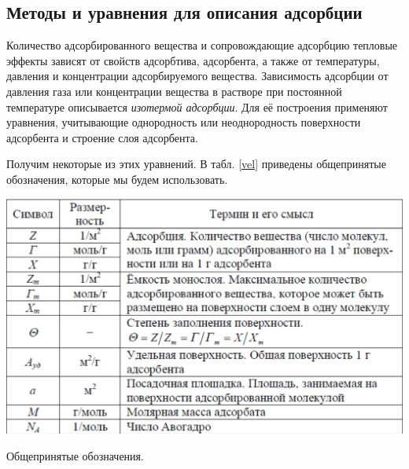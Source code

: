 \documentclass[a4paper,12pt]{article} %
\begin{document}
\subsection*{Методы и уравнения для описания адсорбции}
Количество адсорбированного вещества и сопровождающие адсорбцию тепловые эффекты зависят от свойств адсорбтива, адсорбента, а также от температуры, давления и концентрации адсорбируемого вещества. Зависимость адсорбции от давления газа или концентрации вещества в растворе при постоянной температуре описывается \textit{изотермой адсорбции}. Для её построения применяют уравнения, учитывающие однородность или неоднородность поверхности адсорбента и строение слоя адсорбента.
\par
 Получим некоторые из этих уравнений. В табл. \ref{vel} приведены общепринятые обозначения, которые мы будем использовать.
\begin{table}[H]
\centering 
    \includegraphics[width=15cm]{vel.png}
    \caption{Общепринятые обозначения.}
    \label{vel}
\end{table}
\end{document}

